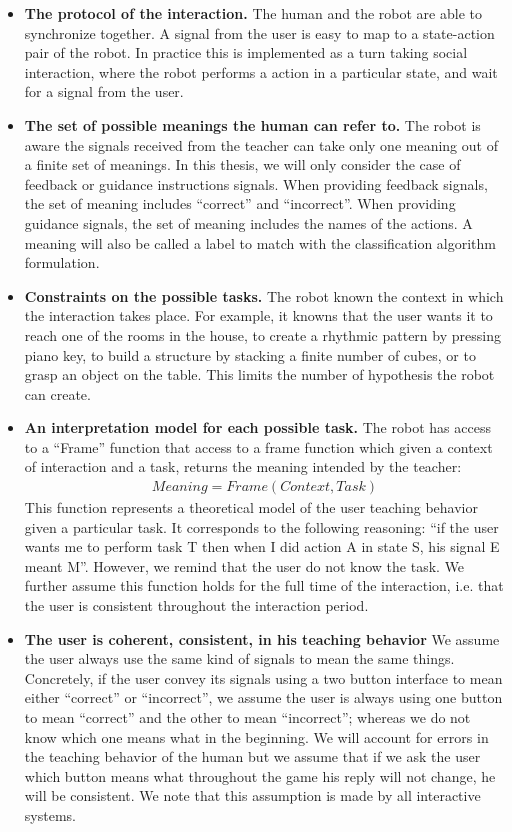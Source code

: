 \begin{itemize}

\item \textbf{The protocol of the interaction.} The human and the robot are able to synchronize together. A signal from the user is easy to map to a state-action pair of the robot. In practice this is implemented as a turn taking social interaction, where the robot performs a action in a particular state, and wait for a signal from the user.

\item \textbf{The set of possible meanings the human can refer to.} The robot is aware the signals received from the teacher can take only one meaning out of a finite set of meanings. In this thesis, we will only consider the case of feedback or guidance instructions signals. When providing feedback signals, the set of meaning includes ``correct'' and ``incorrect''. When providing guidance signals, the set of meaning includes the names of the actions. A meaning will also be called a label to match with the classification algorithm formulation. 

\item \textbf{Constraints on the possible tasks.} The robot known the context in which the interaction takes place. For example, it knowns that the user wants it to reach one of the rooms in the house, to create a rhythmic pattern by pressing piano key, to build a structure by stacking a finite number of cubes, or to grasp an object on the table. This limits the number of hypothesis the robot can create.

\item \textbf{An interpretation model for each possible task.} The robot has access to a ``Frame'' function that access to a frame function which given a context of interaction and a task, returns the meaning intended by the teacher:
%
\begin{eqnarray}
Meaning = Frame(Context, Task) \nonumber
\end{eqnarray}
%
This function represents a theoretical model of the user teaching behavior given a particular task. It corresponds to the following reasoning: ``if the user wants me to perform task T then when I did action A in state S, his signal E meant M''. However, we remind that the user do not know the task. We further assume this function holds for the full time of the interaction, i.e. that the user is consistent throughout the interaction period.

\item \textbf{The user is coherent, consistent, in his teaching behavior} We assume the user always use the same kind of signals to mean the same things. Concretely, if the user convey its signals using a two button interface to mean either ``correct'' or ``incorrect'', we assume the user is always using one button to mean ``correct'' and the other to mean ``incorrect''; whereas we do not know which one means what in the beginning. We will account for errors in the teaching behavior of the human but we assume that if we ask the user which button means what throughout the game his reply will not change, he will be consistent. We note that this assumption is made by all interactive systems.


\end{itemize}
